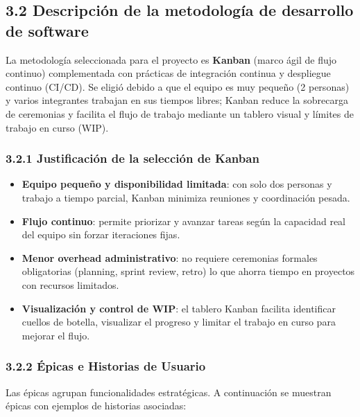 \subsection{3.2 Descripción de la metodología de desarrollo de software}
La metodología seleccionada para el proyecto es \textbf{Kanban} (marco ágil de flujo continuo) complementada con prácticas de integración continua y despliegue continuo (CI/CD). Se eligió debido a que el equipo es muy pequeño (2 personas) y varios integrantes trabajan en sus tiempos libres; Kanban reduce la sobrecarga de ceremonias y facilita el flujo de trabajo mediante un tablero visual y límites de trabajo en curso (WIP).

\subsubsection{3.2.1 Justificación de la selección de Kanban}
\begin{itemize}
	\item \textbf{Equipo pequeño y disponibilidad limitada}: con solo dos personas y trabajo a tiempo parcial, Kanban minimiza reuniones y coordinación pesada.
	\item \textbf{Flujo continuo}: permite priorizar y avanzar tareas según la capacidad real del equipo sin forzar iteraciones fijas.
	\item \textbf{Menor overhead administrativo}: no requiere ceremonias formales obligatorias (planning, sprint review, retro) lo que ahorra tiempo en proyectos con recursos limitados.
	\item \textbf{Visualización y control de WIP}: el tablero Kanban facilita identificar cuellos de botella, visualizar el progreso y limitar el trabajo en curso para mejorar el flujo.
\end{itemize}

\subsubsection{3.2.2 Épicas e Historias de Usuario}
Las épicas agrupan funcionalidades estratégicas. A continuación se muestran épicas con ejemplos de historias asociadas:

